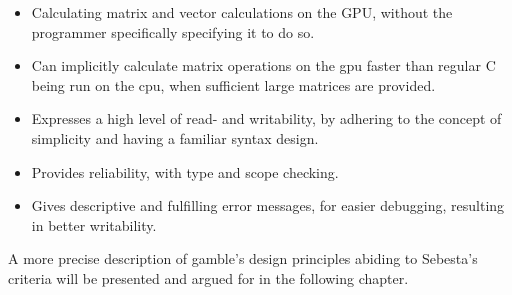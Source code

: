 \begin{itemize}
	\item Calculating matrix and vector calculations on the GPU, without the programmer specifically specifying it to do so.
	\item Can implicitly calculate matrix operations on the \acrshort{gpu} faster than regular C being run on the \acrshort{cpu}, when sufficient large matrices are provided.
	\item Expresses a high level of read- and writability, by adhering to the concept of simplicity and having a familiar syntax design.
	\item Provides reliability, with type and scope checking.
	\item Gives descriptive and fulfilling error messages, for easier debugging, resulting in better writability.
\end{itemize}

A more precise description of \gls{gamble}'s design principles abiding to Sebesta's criteria will be presented and argued for in the following chapter.
